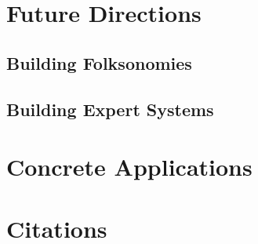 \documentclass[12pt, twoside]{article}
\begin{document}
\section{Future Directions}

\subsection{Building Folksonomies}

\subsection{Building Expert Systems}

\section{Concrete Applications}

\section{Citations}

\printbibliography
\end{document}
